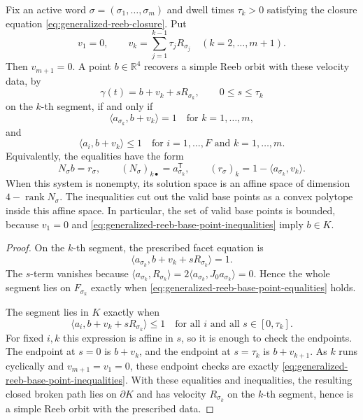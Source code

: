\begin{lemma}\label{lem:generalized-reeb-base-point-recovery}
Fix an active word \(\sigma=(\sigma_1,\ldots,\sigma_m)\) and dwell times
\(\tau_k>0\) satisfying the closure equation
\eqref{eq:generalized-reeb-closure}. Put
\[
  v_1=0,
  \qquad
  v_k=\sum_{j=1}^{k-1}\tau_jR_{\sigma_j}
  \quad (k=2,\ldots,m+1).
\]
Then \(v_{m+1}=0\). A point \(b\in\mathbb{R}^4\) recovers a simple Reeb orbit
with these velocity data, by
\[
  \gamma(t)=b+v_k+sR_{\sigma_k},
  \qquad 0\leq s\leq \tau_k
\]
on the \(k\)-th segment, if and only if
\begin{equation}\label{eq:generalized-reeb-base-point-equalities}
  \langle a_{\sigma_k}, b+v_k\rangle=1
  \quad\text{for }k=1,\ldots,m,
\end{equation}
and
\begin{equation}\label{eq:generalized-reeb-base-point-inequalities}
  \langle a_i,b+v_k\rangle\leq 1
  \quad\text{for }i=1,\ldots,F\text{ and }k=1,\ldots,m.
\end{equation}
Equivalently, the equalities have the form
\[
  N_\sigma b = r_\sigma,
  \qquad
  (N_\sigma)_{k\bullet}=a_{\sigma_k}^{\mathsf T},
  \qquad
  (r_\sigma)_k=1-\langle a_{\sigma_k},v_k\rangle .
\]
When this system is nonempty, its solution space is an affine space of
dimension \(4-\operatorname{rank}N_\sigma\). The inequalities cut out the
valid base points as a convex polytope inside this affine space. In particular,
the set of valid base points is bounded, because \(v_1=0\) and
\eqref{eq:generalized-reeb-base-point-inequalities} imply \(b\in K\).
\end{lemma}

\begin{proof}
On the \(k\)-th segment, the prescribed facet equation is
\[
  \langle a_{\sigma_k}, b+v_k+sR_{\sigma_k}\rangle=1.
\]
The \(s\)-term vanishes because
\(\langle a_{\sigma_k},R_{\sigma_k}\rangle
=2\langle a_{\sigma_k},J_0a_{\sigma_k}\rangle=0\). Hence the whole segment
lies on \(F_{\sigma_k}\) exactly when
\eqref{eq:generalized-reeb-base-point-equalities} holds.

The segment lies in \(K\) exactly when
\[
  \langle a_i,b+v_k+sR_{\sigma_k}\rangle\leq 1
  \quad\text{for all }i\text{ and all }s\in[0,\tau_k].
\]
For fixed \(i,k\) this expression is affine in \(s\), so it is enough to check
the endpoints. The endpoint at \(s=0\) is \(b+v_k\), and the endpoint at
\(s=\tau_k\) is \(b+v_{k+1}\). As \(k\) runs cyclically and \(v_{m+1}=v_1=0\),
these endpoint checks are exactly
\eqref{eq:generalized-reeb-base-point-inequalities}. With these equalities and
inequalities, the resulting closed broken path lies on \(\partial K\) and has
velocity \(R_{\sigma_k}\) on the \(k\)-th segment, hence is a simple Reeb orbit
with the prescribed data.
\end{proof}

